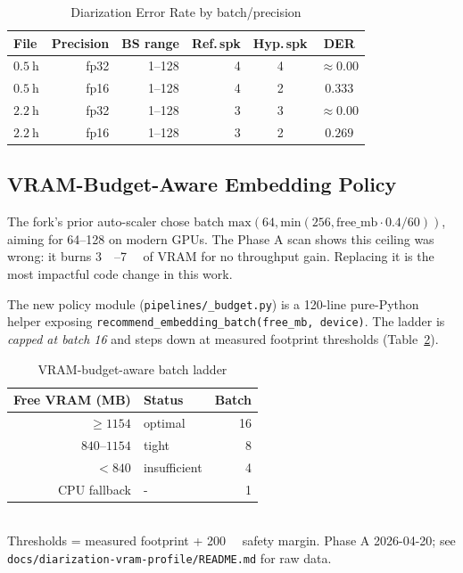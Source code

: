 \documentclass[conference,10pt]{IEEEtran}
\begin{document}
\begin{table}[!t]
\centering
\caption{Diarization Error Rate by batch/precision}
\label{tab:diar-der}
\begin{tabular}{@{}lrrrcc@{}}
\toprule
\textbf{File} & \textbf{Precision} & \textbf{BS range} &
\textbf{Ref.\,spk} & \textbf{Hyp.\,spk} & \textbf{DER} \\
\midrule
$\SI{0.5}{\hour}$ & fp32 & 1--128 & 4 & 4 & $\approx 0.00$ \\
$\SI{0.5}{\hour}$ & fp16 & 1--128 & 4 & 2 & $0.333$ \\
$\SI{2.2}{\hour}$ & fp32 & 1--128 & 3 & 3 & $\approx 0.00$ \\
$\SI{2.2}{\hour}$ & fp16 & 1--128 & 3 & 2 & $0.269$ \\
\bottomrule
\end{tabular}
\end{table}

\subsection{VRAM-Budget-Aware Embedding Policy}

The fork's prior auto-scaler chose batch
$\text{max}(64, \text{min}(256, \text{free\_mb} \cdot 0.4 / 60))$,
aiming for \SIrange{64}{128}{} on modern GPUs. The Phase A scan shows
this ceiling was wrong: it burns \SIrange{3}{7}{\giga\byte} of VRAM
for no throughput gain. Replacing it is the most impactful code change
in this work.

The new policy module
(\texttt{pipelines/\_budget.py}) is a
\SI{120}{}-line pure-Python helper exposing
\texttt{recommend\_embedding\_batch(free\_mb, device)}. The ladder is
\emph{capped at batch 16} and steps down at measured footprint
thresholds (Table~\ref{tab:budget-ladder}).

\begin{table}[!t]
\centering
\caption{VRAM-budget-aware batch ladder}
\label{tab:budget-ladder}
\begin{tabular}{@{}rlr@{}}
\toprule
\textbf{Free VRAM (MB)} & \textbf{Status} & \textbf{Batch} \\
\midrule
$\ge 1154$   & optimal       & 16 \\
$840$--$1154$ & tight         & 8 \\
$< 840$      & insufficient  & 4 \\
CPU fallback & -             & 1 \\
\bottomrule
\end{tabular}
\\[4pt]
{\footnotesize Thresholds = measured footprint + \SI{200}{\mebi\byte}
  safety margin. Phase A 2026-04-20; see
  \texttt{docs/diarization-vram-profile/README.md} for raw data.}
\end{table}
\end{document}
